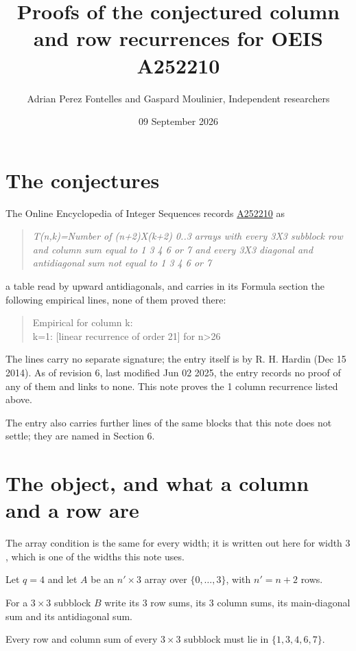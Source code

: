 \documentclass[11pt]{article}
\title{Proofs of the conjectured column and row recurrences for OEIS A252210}
\author{Adrian Perez Fontelles and Gaspard Moulinier, Independent researchers}
\date{09 September 2026}
\theoremstyle{definition}
\begin{document}
\maketitle
\section{The conjectures}

The Online Encyclopedia of Integer Sequences records \href{https://oeis.org/A252210}{A252210} as

\begin{quote}\itshape T(n,k)=Number of (n+2)X(k+2) 0..3 arrays with every 3X3 subblock row and column sum equal to 1 3 4 6 or 7 and every 3X3 diagonal and antidiagonal sum not equal to 1 3 4 6 or 7\end{quote}

a table read by upward antidiagonals, and carries in its Formula section the following empirical lines, none of them proved there:

\begin{quote}\ttfamily Empirical for column k:\\
k=1: [linear recurrence of order 21] for n>26\end{quote}

The lines carry no separate signature; the entry itself is by R. H. Hardin (Dec 15 2014). As of revision 6, last modified Jun 02 2025, the entry records no proof of any of them and links to none. This note proves the 1 column recurrence listed above.

The entry also carries further lines of the same blocks that this note does not settle; they are named in Section 6.

\section{The object, and what a column and a row are}

The array condition is the same for every width; it is written out here for width $3$, which is one of the widths this note uses.

Let $q = 4$ and let $A$ be an $n' \times 3$ array over $\{0,\dots,3\}$, with $n' = n + 2$ rows.

For a $3\times3$ subblock $B$ write its 3 row sums, its 3 column sums, its main-diagonal sum and its antidiagonal sum.

Every row and column sum of every $3\times3$ subblock must lie in $\{1, 3, 4, 6, 7\}$.
\end{document}
